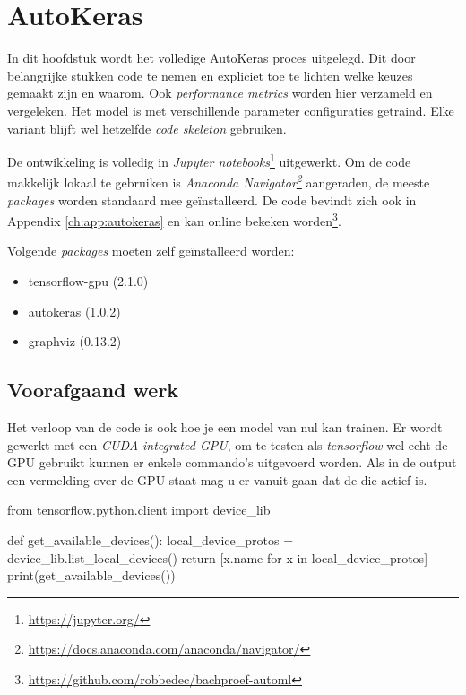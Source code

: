 
\chapter{AutoKeras}
\label{ch:autokeras}

In dit hoofdstuk wordt het volledige AutoKeras proces uitgelegd. Dit door belangrijke stukken code te nemen en expliciet toe te lichten welke keuzes gemaakt zijn en waarom. Ook \textit{performance metrics} worden hier verzameld en vergeleken. Het model is met verschillende parameter configuraties getraind. Elke variant blijft wel hetzelfde \textit{code skeleton} gebruiken.

De ontwikkeling is volledig in \textit{Jupyter notebooks}\footnote{\url{https://jupyter.org/}} uitgewerkt. Om de code makkelijk lokaal te gebruiken is \textit{Anaconda Navigator\footnote{\url{https://docs.anaconda.com/anaconda/navigator/}}} aangeraden, de meeste \textit{packages} worden standaard mee geïnstalleerd. De code bevindt zich ook in Appendix \ref{ch:app:autokeras} en kan online bekeken worden\footnote{\url{https://github.com/robbedec/bachproef-automl}}.

Volgende \textit{packages} moeten zelf geïnstalleerd worden:

\begin{itemize}
    \item tensorflow-gpu (2.1.0)
    \item autokeras (1.0.2)
    \item graphviz (0.13.2)
\end{itemize}

\section{Voorafgaand werk}

Het verloop van de code is ook hoe je een model van nul kan trainen. Er wordt gewerkt met een \textit{CUDA integrated GPU}, om te testen als \textit{tensorflow} wel echt de GPU gebruikt kunnen er enkele commando's uitgevoerd worden. Als in de output een vermelding over de GPU staat mag u er vanuit gaan dat de die actief is.

\begin{python}
    from tensorflow.python.client import device_lib
    
    def get_available_devices():
        local_device_protos = device_lib.list_local_devices()
        return [x.name for x in local_device_protos]
    print(get_available_devices()) 
\end{python}


